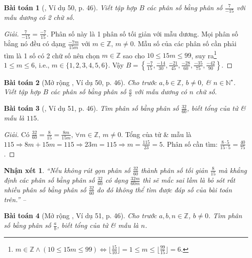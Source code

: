 \documentclass{article}
\newtheorem{baitoan}{Bài toán}
\newtheorem{nhanxet}{Nhận xét}
\begin{document}
\begin{baitoan}[\cite{Tuyen_Toan_6}, Ví dụ 50, p. 46]
	Viết tập hợp $B$ các phân số bằng phân số $\frac{7}{-15}$ với mẫu dương có 2 chữ số.
\end{baitoan}

\begin{proof}[Giải]
	$\frac{7}{-15} = \frac{-7}{15}$. Phân số này là 1 phân số tối giản với mẫu dương. Mọi phân số bằng nó đều có dạng $\frac{-7m}{15m}$ với $m\in\mathbb{Z}$, $m\ne0$. Mẫu số của các phân số cần phải tìm là 1 số có 2 chữ số nên chọn $m\in\mathbb{Z}$ sao cho $10\le15m\le 99$, suy ra\footnote{$m\in\mathbb{Z}\land(10\le15m\le 99)\Leftrightarrow\lfloor\frac{15}{10}\rfloor = 1\le m\le\lfloor\frac{99}{15}\rfloor = 6$.} $1\le m\le6$, i.e., $m\in\{1,2,3,4,5,6\}$. Vậy $B = \left\{\frac{-7}{15},\frac{-14}{30},\frac{-21}{45},\frac{-28}{60},\frac{-35}{75},\frac{-42}{90}\right\}$.
\end{proof}

\begin{baitoan}[Mở rộng \cite{Tuyen_Toan_6}, Ví dụ 50, p. 46]
	Cho trước $a,b\in\mathbb{Z}$, $b\ne0$, \& $n\in\mathbb{N}^\star$. Viết tập hợp $B$ các phân số bằng phân số $\frac{a}{b}$ với mẫu dương có $n$ chữ số.
\end{baitoan}

\begin{baitoan}[\cite{Tuyen_Toan_6}, Ví dụ 51, p. 46]
	Tìm phân số bằng phân số $\frac{32}{60}$, biết tổng của tử \& mẫu là $115$.
\end{baitoan}	

\begin{proof}[Giải]
	Có $\frac{32}{60} = \frac{8}{15} = \frac{8m}{15m}$, $\forall m\in\mathbb{Z}$, $m\ne0$. Tổng của tử \& mẫu là $115\Rightarrow8m + 15m = 115\Rightarrow23m = 115\Rightarrow m =\frac{115}{23} = 5$. Phân số cần tìm: $\frac{8\cdot5}{15\cdot5} = \frac{40}{75}$.
\end{proof}

\begin{nhanxet}
	``Nếu không rút gọn phân số $\frac{32}{60}$ thành phân số tối giản $\frac{8}{15}$ mà khẳng định các phân số bằng phân số $\frac{32}{60}$ có dạng $\frac{32m}{60m}$ thì sẽ mắc sai lầm là bỏ sót rất nhiều phân số bằng phân số $\frac{32}{60}$ do đó không thể tìm được đáp số của bài toán trên.'' -- \cite[p. 46]{Tuyen_Toan_6}
\end{nhanxet}

\begin{baitoan}[Mở rộng \cite{Tuyen_Toan_6}, Ví dụ 51, p. 46]
	Cho trước $a,b,n\in\mathbb{Z}$, $b\ne0$. Tìm phân số bằng phân số $\frac{a}{b}$, biết tổng của tử \& mẫu là $n$.
\end{baitoan}
\end{document}
